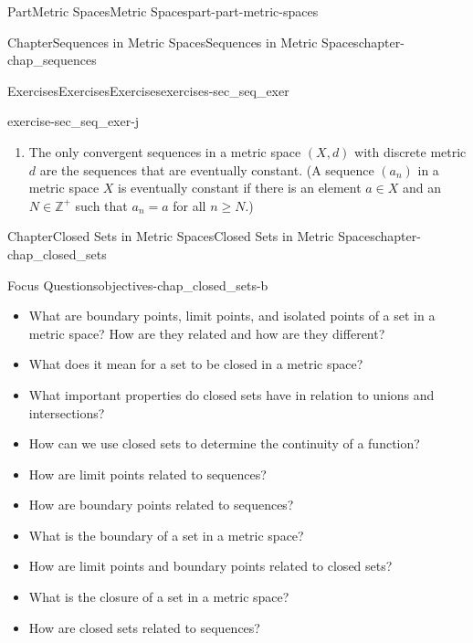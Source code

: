 \documentclass[oneside,10pt,]{book}
\newcommand{\xreffont}{\relax}
\numberwithin{equation}{chapter}
\newcommand{\Z}{\mathbb{Z}}
\begin{document}
\begin{partptx}{Part}{Metric Spaces}{}{Metric Spaces}{}{}{part-part-metric-spaces}
\begin{chapterptx}{Chapter}{Sequences in Metric Spaces}{}{Sequences in Metric Spaces}{}{}{chapter-chap_sequences}
\begin{exercises-section}{Exercises}{Exercises}{}{Exercises}{}{}{exercises-sec_seq_exer}
\begin{divisionexercise}{10}{}{}{exercise-sec_seq_exer-j}
\begin{enumerate}[font=\bfseries,label=(\alph*),ref=\alph*]
\begin{equation*}
d\left(\frac{a}{b}, \frac{r}{s}\right) = \max\{| a-r |, | b-s |\}\text{.}
\end{equation*}
(See \hyperlink{exercise-ex_MS_Q_metric}{Exercise~{\xreffont 3}}.)%
\item{}The only convergent sequences in a metric space \((X,d)\) with discrete metric \(d\) are the sequences that are eventually constant. (A sequence \((a_n)\) in a metric space \(X\) is eventually constant if there is an element \(a \in X\) and an \(N \in \Z^+\) such that \(a_n = a\) for all \(n \geq N\).)%
\end{enumerate}%
\end{divisionexercise}%
\end{exercises-section}
\end{chapterptx}
%
\typeout{************************************************}
\typeout{************************************************}
%
\begin{chapterptx}{Chapter}{Closed Sets in Metric Spaces}{}{Closed Sets in Metric Spaces}{}{}{chapter-chap_closed_sets}
\renewcommand*{\chaptername}{Chapter}
\begin{objectives}{Focus Questions}{objectives-chap_closed_sets-b}
%
\begin{itemize}[label=\textbullet]
\item{}What are boundary points, limit points, and isolated points of a set in a metric space? How are they related and how are they different?%
\item{}What does it mean for a set to be closed in a metric space?%
\item{}What important properties do closed sets have in relation to unions and intersections?%
\item{}How can we use closed sets to determine the continuity of a function?%
\item{}How are limit points related to sequences?%
\item{}How are boundary points related to sequences?%
\item{}What is the boundary of a set in a metric space?%
\item{}How are limit points and boundary points related to closed sets?%
\item{}What is the closure of a set in a metric space?%
\item{}How are closed sets related to sequences?%
\end{itemize}
\end{objectives}

\end{chapterptx}
\end{partptx}
\end{document}
